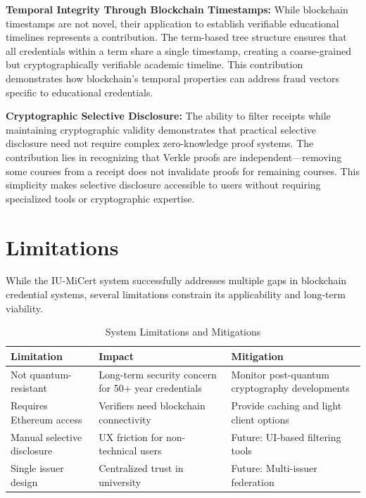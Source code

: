 \textbf{Temporal Integrity Through Blockchain Timestamps:} While blockchain timestamps are not novel, their application to establish verifiable educational timelines represents a contribution. The term-based tree structure ensures that all credentials within a term share a single timestamp, creating a coarse-grained but cryptographically verifiable academic timeline. This contribution demonstrates how blockchain's temporal properties can address fraud vectors specific to educational credentials.

\textbf{Cryptographic Selective Disclosure:} The ability to filter receipts while maintaining cryptographic validity demonstrates that practical selective disclosure need not require complex zero-knowledge proof systems. The contribution lies in recognizing that Verkle proofs are independent—removing some courses from a receipt does not invalidate proofs for remaining courses. This simplicity makes selective disclosure accessible to users without requiring specialized tools or cryptographic expertise.

\section{Limitations}
\label{sec:limitations}

While the IU-MiCert system successfully addresses multiple gaps in blockchain credential systems, several limitations constrain its applicability and long-term viability.

\begin{table}[H]
\centering
\caption{System Limitations and Mitigations}
\label{tab:limitations}
\begin{tabular}{|p{5cm}|p{4cm}|p{4cm}|}
\hline
\textbf{Limitation} & \textbf{Impact} & \textbf{Mitigation} \\
\hline
Not quantum-resistant & Long-term security concern for 50+ year credentials & Monitor post-quantum cryptography developments \\
\hline
Requires Ethereum access & Verifiers need blockchain connectivity & Provide caching and light client options \\
\hline
Manual selective disclosure & UX friction for non-technical users & Future: UI-based filtering tools \\
\hline
Single issuer design & Centralized trust in university & Future: Multi-issuer federation \\
\hline
\end{tabular}
\end{table}

